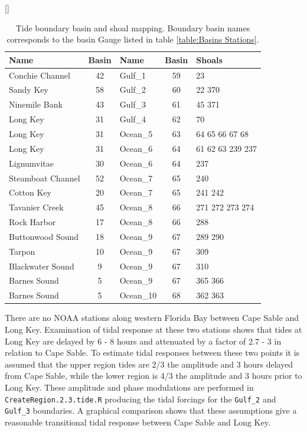 \begin{table}[H]
  [\FBwidth]
  {
     \caption{ Tide boundary basin and shoal mapping. Boundary basin names 
               corresponds to the basin Gauge listed in 
               table \ref{table:Basins Stations}. }
     \label{table:Tide Basin Shoals}
  }
  {
    \centering
    \begin{tabular}{ l c l c l }
      \hline
      Name            & Basin & Name    & Basin & Shoals\\
      \hline
      Conchie Channel   &  42 & Gulf\_1   & 59 & 23\\
      Sandy Key         &  58 & Gulf\_2   & 60 & 22 370\\
      Ninemile Bank     &  43 & Gulf\_3   & 61 & 45 371\\
      Long Key          &  31 & Gulf\_4   & 62 & 70\\
      Long Key          &  31 & Ocean\_5  & 63 & 64 65 66 67 68\\
      Long Key          &  31 & Ocean\_6  & 64 & 61 62 63 239 237\\
      Lignumvitae       &  30 & Ocean\_6  & 64 & 237\\
      Steamboat Channel &  52 & Ocean\_7  & 65 & 240\\
      Cotton Key        &  20 & Ocean\_7  & 65 & 241 242\\
      Tavanier Creek    &  45 & Ocean\_8  & 66 & 271 272 273 274\\
      Rock Harbor       &  17 & Ocean\_8  & 66 & 288\\
      Buttonwood Sound  &  18 & Ocean\_9  & 67 & 289 290\\
      Tarpon            &  10 & Ocean\_9  & 67 & 309\\
      Blackwater Sound  &  9  & Ocean\_9  & 67 & 310\\
      Barnes Sound      &  5  & Ocean\_9  & 67 & 365 366\\
      Barnes Sound      &  5  & Ocean\_10 & 68 & 362 363\\
      \hline
    \end{tabular}
  }
\end{table}

There are no NOAA stations along western Florida Bay between Cape Sable and Long Key.  Examination of tidal response at these two stations shows that tides at Long Key are delayed by 6 - 8 hours and attenuated by a factor of 2.7 - 3 in relation to Cape Sable.  To estimate tidal responses between these two points it is assumed that the upper region tides are 2/3 the amplitude and 3 hours delayed from Cape Sable, while the lower region is 4/3 the amplitude and 3 hours prior to Long Key.  These amplitude and phase modulations are performed in \texttt{CreateRegion.2.3.tide.R} producing the tidal forcings for the \texttt{Gulf\_2} and \texttt{Gulf\_3} boundaries.  A graphical comparison shows that these assumptions give a reasonable transitional tidal response between Cape Sable and Long Key.

